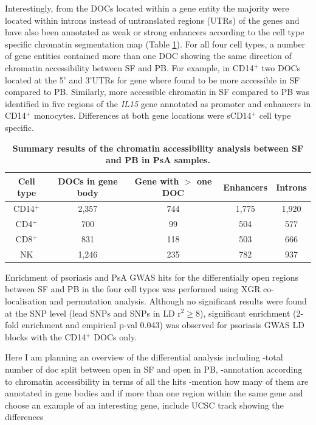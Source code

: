 Interestingly, from the DOCs located within a gene entity the majority were located within introns instead of untranslated regions (UTRs) of the genes and have also been annotated as weak or strong enhancers according to the cell type specific chromatin segmentation map (Table \ref{tab:PSA_DOCs_results}). For all four cell types, a number of gene entities contained more than one DOC showing the same direction of chromatin accessibility between SF and PB. For example, in CD14$^+$ two DOCs located at the 5' and 3'UTRs for  gene where found to be more accessible in SF compared to PB. Similarly, more accessible chromatin in SF compared to PB was identified in five regions of the \textit{IL15} gene annotated as promoter and enhancers in CD14$^+$ monocytes. Differences at both gene locations were sCD14$^+$ cell type specific.

\begin{table}[htbp]
\centering
\begin{tabular}{@{} c c c c c}
\toprule
\textbf{Cell type} & \textbf{DOCs in gene body} &  \textbf{Gene with $>$ one DOC} &\textbf{Enhancers} & \textbf{Introns} \\
\midrule
\midrule
CD14$^+$ & 2,357 & 744 & 1,775 & 1,920 \\
CD4$^+$ & 700 & 99 & 504 & 577 \\
CD8$^+$ & 831 & 118 & 503 & 666 \\
NK   & 1,246 & 235 & 782 & 937 \\   
\bottomrule
\end{tabular}
\medskip %
\caption[Summary results of the chromatin accessibility analysis between SF and PB in PsA samples.]{\textbf{Summary results of the chromatin accessibility analysis between SF and PB in PsA samples.}}
\label{tab:PSA_DOCs_results}
\end{table}


Enrichment of psoriasis and PsA GWAS hits for the differentially open regions between SF and PB in the four cell types was performed using XGR co-localisation and permutation analysis. Although no significant results were found at the SNP level (lead SNPs and SNPs in LD r$^2$$\geq$8), significant enrichment (2-fold enrichment and empirical p-val 0.043) was observed for psoriasis GWAS LD blocks with the CD14$^+$ DOCs only.



Here I am planning an overview of the differential analysis including 
-total number of doc split between open in SF and open in PB,
-annotation according to chromatin accessibility in terms of all the hits
-mention how many of them are annotated in gene bodies and if more than one region within the same gene and choose an example of an interesting gene, include UCSC track showing the differences

